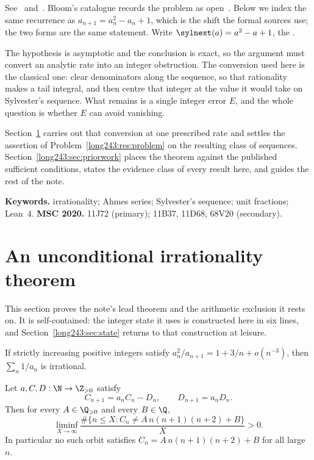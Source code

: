 \noindent See~\cite[p.~64]{erdosgraham1980} and~\cite[p.~105]{erdos1988}.
Bloom's catalogue records the problem as open~\cite{erdosproblems}.
Below we index the same recurrence as
$a_{n+1}=a_n^{2}-a_n+1$, which is the shift the formal sources use; the two
forms are the same statement.  Write $\sylnext(a)=a^{2}-a+1$, the
.

The hypothesis is asymptotic and the conclusion is exact, so the argument must
convert an analytic rate into an integer obstruction.  The conversion used here
is the classical one: clear denominators along the sequence, so that
rationality makes a tail integral, and then centre that integer at the value it
would take on Sylvester's sequence.  What remains is a single integer error
$E$, and the whole question is whether $E$ can avoid vanishing.

Section~\ref{long243:sec:cubicrate} carries out that conversion at one prescribed rate
and settles the assertion of Problem~\ref{long243:res:problem} on the resulting class
of sequences.  Section~\ref{long243:sec:priorwork} places the theorem against the
published sufficient conditions, states the evidence class of every result
here, and guides the rest of the note.

\medskip
\noindent\textbf{Keywords.} irrationality; Ahmes series; Sylvester's sequence;
unit fractions; Lean~4.
\qquad
\textbf{MSC 2020.} 11J72 (primary); 11B37, 11D68, 68V20 (secondary).

\section{An unconditional irrationality theorem}\label{long243:sec:cubicrate}

This section proves the note's lead theorem and the arithmetic exclusion it
rests on.  It is self-contained: the integer state it uses is constructed here
in six lines, and Section~\ref{long243:sec:state} returns to that construction at
leisure.

\begin{theorem}\label{long243:res:cubicrate}
If strictly increasing positive integers satisfy
$a_n^2/a_{n+1}=1+3/n+o(n^{-3})$, then $\sum_n1/a_n$ is irrational.
\end{theorem}

\begin{theorem}\label{long243:res:cubicexclusion}
Let $a,C,D:\N\to\Z_{>0}$ satisfy
\begin{equation}\label{long243:eq:cubicorbit}
 C_{n+1}=a_nC_n-D_n,\qquad D_{n+1}=a_nD_n .
\end{equation}
Then for every $A\in\Q_{>0}$ and every $B\in\Q$,
\[
 \liminf_{X\to\infty}
 \frac{\#\{n\le X:C_n\ne A\,n(n+1)(n+2)+B\}}{X}>0 .
\]
In particular no such orbit satisfies $C_n=A\,n(n+1)(n+2)+B$ for all
large $n$.
\end{theorem}

